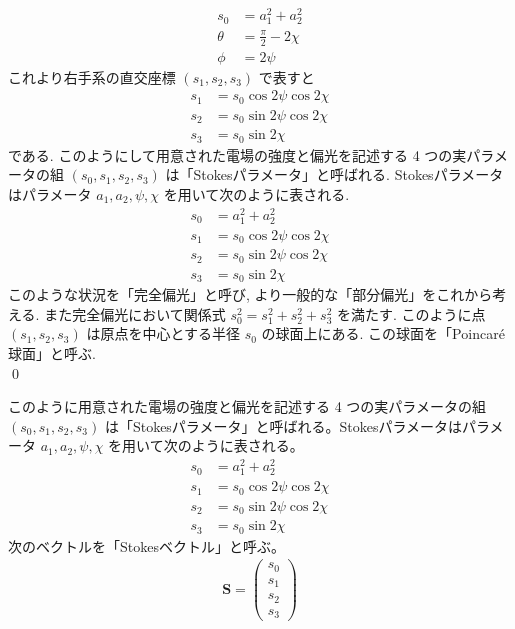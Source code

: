 \documentclass[uplatex,dvipdfmx,a4paper,11pt]{jlreq}
\makeatletter
\newcommand\mqty[1]{\begin{pmatrix}#1\end{pmatrix}}
\theoremstyle{definition}
\renewenvironment{proof}[1][\proofname]{\par
  \normalfont
  \topsep6\p@\@plus6\p@ \trivlist
  \item[\hskip\labelsep{\bfseries #1}\@addpunct{\bfseries}]\ignorespaces\quad\par
}{%
  \qed\endtrivlist\@endpefalse
}
\renewcommand\proofname{証明}
\makeatother
\begin{document}
\begin{proof}
  \begin{align}
    s_0    & = a_1^2 + a_2^2         \\
    \theta & = \frac{\pi}{2} - 2\chi \\
    \phi   & = 2\psi
  \end{align}
  これより右手系の直交座標 $(s_1, s_2, s_3)$ で表すと
  \begin{align}
    s_1 & = s_0\cos2\psi\cos2\chi \\
    s_2 & = s_0\sin2\psi\cos2\chi \\
    s_3 & = s_0\sin2\chi
  \end{align}
  である. このようにして用意された電場の強度と偏光を記述する 4 つの実パラメータの組 $(s_0, s_1, s_2, s_3)$ は「Stokesパラメータ」と呼ばれる. Stokesパラメータはパラメータ $a_1, a_2, \psi, \chi$ を用いて次のように表される.
  \begin{align}
    s_0 & = a_1^2 + a_2^2                        \\
    s_1 & = s_0\cos2\psi\cos2\chi \label{s1 def} \\
    s_2 & = s_0\sin2\psi\cos2\chi \label{s2 def} \\
    s_3 & = s_0\sin2\chi \label{s3 def}
  \end{align}
  このような状況を「完全偏光」と呼び, より一般的な「部分偏光」をこれから考える. また完全偏光において関係式 $s_0^2 = s_1^2 + s_2^2 + s_3^2$ を満たす. このように点 $(s_1, s_2, s_3)$ は原点を中心とする半径 $s_0$ の球面上にある. この球面を「Poincaré 球面」と呼ぶ. \\
\end{proof}

\begin{definition}
  このように用意された電場の強度と偏光を記述する 4 つの実パラメータの組 $(s_0, s_1, s_2, s_3)$ は「Stokesパラメータ」と呼ばれる。Stokesパラメータはパラメータ $a_1, a_2, \psi, \chi$ を用いて次のように表される。
  \begin{align}
    s_0 & = a_1^2 + a_2^2           \\
    s_1 & = s_0\cos 2\psi\cos 2\chi \\
    s_2 & = s_0\sin 2\psi\cos 2\chi \\
    s_3 & = s_0\sin 2\chi
  \end{align}
  次のベクトルを「Stokesベクトル」と呼ぶ。
  \begin{align}
    \bm{S} = \mqty{s_0 \\ s_1 \\ s_2 \\ s_3}
  \end{align}
\end{definition}
\end{document}
